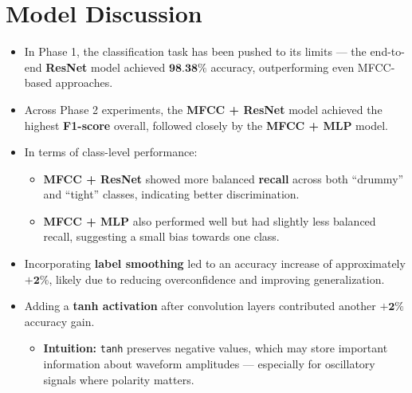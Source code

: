 \documentclass{article}
\begin{document}
\section{Model Discussion}
\begin{itemize}
    \item In Phase 1, the classification task has been pushed to its limits — the end-to-end \textbf{ResNet} model achieved \(\textbf{98.38\%}\) accuracy, outperforming even MFCC-based approaches.
    \item Across Phase 2 experiments, the \textbf{MFCC + ResNet} model achieved the highest \textbf{F1-score} overall, followed closely by the \textbf{MFCC + MLP} model.
    \item In terms of class-level performance:
        \begin{itemize}
            \item \textbf{MFCC + ResNet} showed more balanced \textbf{recall} across both “drummy” and “tight” classes, indicating better discrimination.
            \item \textbf{MFCC + MLP} also performed well but had slightly less balanced recall, suggesting a small bias towards one class.
        \end{itemize}
    \item Incorporating \textbf{label smoothing} led to an accuracy increase of approximately \(\textbf{+2\%}\), likely due to reducing overconfidence and improving generalization.
    \item Adding a \textbf{tanh activation} after convolution layers contributed another \(\textbf{+2\%}\) accuracy gain.
        \begin{itemize}
            \item \textbf{Intuition:} \texttt{tanh} preserves negative values, which may store important information about waveform amplitudes — especially for oscillatory signals where polarity matters.
        \end{itemize}
\end{itemize}
\end{document}
